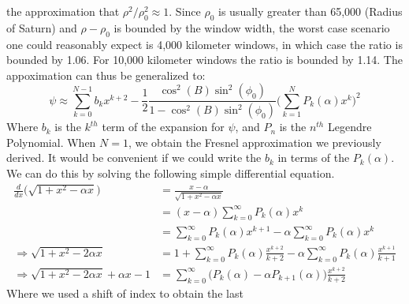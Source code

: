             the approximation that
            $\rho^{2}/\rho_{0}^{2}\approx{1}$.
            Since $\rho_{0}$ is usually greater
            than 65,000 (Radius of Saturn) and
            $\rho-\rho_{0}$ is bounded by the window width,
            the worst case scenario one could reasonably
            expect is 4,000 kilometer windows, in which
            case the ratio is bounded by 1.06. For
            10,000 kilometer windows the ratio is bounded
            by 1.14. The appoximation can thus be
            generalized to:
            \begin{equation*}
                \psi\approx
                \sum_{k=0}^{N-1}b_{k}x^{k+2}
                -\frac{1}{2}
                \frac{\cos^{2}(B)\sin^{2}(\phi_{0})}
                     {1-\cos^{2}(B)\sin^{2}(\phi_{0})}
                \Big(\sum_{k=1}^{N}P_{k}(\alpha)x^{k}\Big)^{2}
            \end{equation*}
            Where $b_{k}$ is the $k^{th}$ term of the expansion
            for $\psi$, and $P_{n}$ is the $n^{th}$
            Legendre Polynomial. When $N=1$, we obtain
            the Fresnel approximation we previously
            derived. It would be convenient if we could
            write the $b_{k}$ in terms of the
            $P_{k}(\alpha)$. We can do this by solving the
            following simple differential equation.
            \begin{align*}
                \frac{d}{dx}
                \Big(\sqrt{1+x^{2}-\alpha{x}}\Big)
                &=\frac{x-\alpha}{\sqrt{1+x^{2}-\alpha{x}}}\\
                &=(x-\alpha)
                  \sum_{k=0}^{\infty}P_{k}(\alpha)x^{k}\\
                &=\sum_{k=0}^{\infty}P_{k}(\alpha)x^{k+1}
                 -\alpha\sum_{k=0}^{\infty}P_{k}(\alpha)x^{k}\\
                \Rightarrow
                \sqrt{1+x^{2}-2\alpha{x}}
                &=1+\sum_{k=0}^{\infty}P_{k}(\alpha)
                    \frac{x^{k+2}}{k+2}
                 -\alpha\sum_{k=0}^{\infty}P_{k}(\alpha)
                  \frac{x^{k+1}}{k+1}\\
                \Rightarrow
                \sqrt{1+x^{2}-2\alpha{x}}+\alpha{x}-1
                &=\sum_{k=0}^{\infty}
                    \Big(
                        P_{k}(\alpha)-\alpha{P_{k+1}}(\alpha)
                    \Big)
                    \frac{x^{k+2}}{k+2}
            \end{align*}
            Where we used a shift of index to obtain the last
